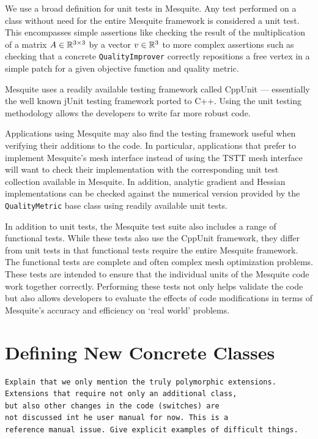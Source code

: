 \documentclass[letter]{report}
\begin{document}
We use a broad definition for unit tests in Mesquite. Any test
performed on a class without need for the entire Mesquite framework is
considered a unit test. This encompasses simple assertions like
checking the result of the multiplication of a matrix $A \in
\Bbb{R}^{3 \times 3}$ by a vector $v \in \Bbb{R}^{3}$ to more complex
assertions such as checking that a concrete \texttt{QualityImprover}
correctly repositions a free vertex in a simple patch for a given
objective function and quality metric.

Mesquite uses a readily available testing framework called CppUnit
\cite{cppunit} --- essentially the well known jUnit testing framework
ported to C++.  Using the unit testing methodology allows the
developers to write far more robust code.

Applications using Mesquite may also find the testing framework useful
when verifying their additions to the code. In particular,
applications that prefer to implement Mesquite's mesh interface
instead of using the TSTT mesh interface will want to
check their implementation with the corresponding unit test collection
available in Mesquite. In addition, analytic gradient and Hessian
implementations can be checked against the numerical version provided
by the {\tt QualityMetric} base class using readily available unit
tests.

In addition to unit tests, the Mesquite test suite also includes
a range of functional tests.  While these tests also use the
CppUnit framework, they differ from unit tests in that 
functional tests require the entire Mesquite framework.
The functional tests are complete and often complex mesh
optimization problems.  These tests are intended to ensure that
the individual units of the Mesquite code work together correctly.
Performing these tests not only helps
validate the code but also allows developers to evaluate the
effects of code modifications in terms of Mesquite's accuracy
and efficiency on `real world' problems.

\section{Defining New Concrete Classes}

\begin{verbatim}
Explain that we only mention the truly polymorphic extensions. 
Extensions that require not only an additional class, 
but also other changes in the code (switches) are 
not discussed int he user manual for now. This is a 
reference manual issue. Give explicit examples of difficult things. 
\end{verbatim}
\end{document}
